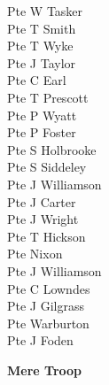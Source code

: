 \begin{multicols}{3}
  Pte W Tasker \\
  Pte T Smith \\
  Pte T Wyke \\
  Pte J Taylor \\
  Pte C Earl \\
  Pte T Prescott \\
  Pte P Wyatt \\
  Pte P Foster \\
  Pte S Holbrooke \\
  Pte S Siddeley \\
  Pte J Williamson \\
  Pte J Carter \\
  Pte J Wright \\
  Pte T Hickson \\
  Pte Nixon \\
  Pte J Williamson \\
  Pte C Lowndes \\
  Pte J Gilgrass \\
  Pte Warburton \\
  Pte J Foden \\
\end{multicols}

\pagebreak

\vspace*{10mm}

\begin{center}
  \Large
  \textbf{Mere Troop}
\end{center}

\vspace*{10mm}

